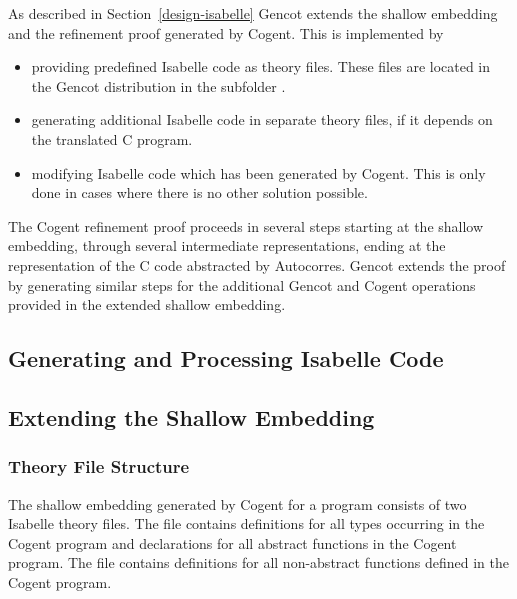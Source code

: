 As described in Section~\ref{design-isabelle} Gencot extends the shallow embedding and 
the refinement proof generated by Cogent. This is implemented by
\begin{itemize}
\item providing predefined Isabelle code as theory files. These files are located 
in the Gencot distribution in the subfolder .
\item generating additional Isabelle code in separate theory files, if it depends 
on the translated C program.
\item modifying Isabelle code which has been generated by Cogent. This is only done
in cases where there is no other solution possible.
\end{itemize}

The Cogent refinement proof proceeds in several steps starting at the shallow embedding, through several intermediate
representations, ending at the representation of the C code abstracted by Autocorres. Gencot extends the proof by
generating similar steps for the additional Gencot and Cogent operations provided in the extended shallow embedding.

\subsection{Generating and Processing Isabelle Code}
\label{impl-isabelle-code}

\subsection{Extending the Shallow Embedding}
\label{impl-isabelle-shallow}

\subsubsection{Theory File Structure}

The shallow embedding generated by Cogent for a program  consists of two Isabelle theory files. The file 
 contains definitions for all types occurring in the Cogent program and declarations
for all abstract functions in the Cogent program. The file  contains definitions 
for all non-abstract functions defined in the Cogent program.

